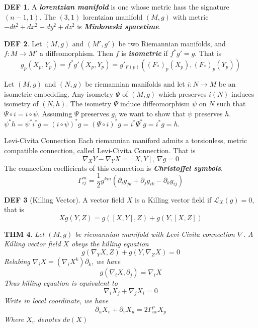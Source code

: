\documentclass[twocolumn]{article}
\renewcommand{\emph}[1]{\textbf{\textit{#1}}}
\newcommand{\n}{\nabla}
\newcommand{\p}{\partial}
\newcommand{\G}{\Gamma}
\newtheorem{thm}{THM}
\theoremstyle{definition}
\newtheorem{defi}[thm]{DEF}
\begin{document}
\begin{defi}
	A \emph{lorentzian manifold} is one whose metric hass the signature $(n-1,1)$.
	The $(3,1)$ lorentzian manifold $(M, g)$ with metric $-dt^2 + dx^2 + dy^2 + dz^2$ is \emph{Minkowski spacetime}.
\end{defi}

\begin{defi}
	Let $(M, g)$ and $(M', g')$ be two Riemannian manifolds, and $f: M \rightarrow M'$ a diffeomorphism. 
	Then $f$ is \emph{isometric} if $f^*g' = g$.
	That is 
	$$
	g_p(X_p, Y_p) = f^*g'(X_p, Y_p) = g'_{F(p)}((F_*)_p(X_p), (F_*)_p(Y_p))
	$$
\end{defi}

\begin{eg}{}{}
	Let $(M, g)$ and $(N, g)$ be riemannian manifolds and let $i: N \rightarrow M$ be an isometric embedding. Any isometry $\Psi$ of $(M, g)$ which preserves $i(N)$ induces isometry of $(N, h)$.
	\tcblower
	The isometry $\Psi$ induce diffeomorphism $\psi$ on $N$ such that $\Psi \circ i = i \circ \psi$. 
	Assuming $\Psi$ preserves $g$, we want to show that $\psi$ preserves $h$.
	$\psi^*h = \psi^*i^*g = (i \circ \psi)^* g = (\Psi \circ i)^*g = i^* \Psi^* g = i^* g = h$.
\end{eg}

\begin{fthm}{Levi-Civita Connection}{}
	Each riemannian maniford admits a torsionless, metric compatible connection, called Levi-Civita Connection.
	That is
	$$
		\n_X Y - \n_Y X = [X, Y], \ \n g = 0
	$$
	The connection coefficients of this connection is \emph{Christoffel symbols}.
	$$
		\G_{ij}^m = \frac{1}{2} g^{km}(\p_i g_{jk} + \p_j g_{ik} - \p_k g_{ij} )
	$$
\end{fthm}

\begin{defi}[Killing Vector]
	A vector field $X$ is a Killing vector field if $\mathcal{L}_X(g) = 0$, that is 
	$$
	Xg(Y, Z) = g([X, Y], Z) + g(Y, [X, Z])
	$$
\end{defi}

\begin{thm}
	Let $(M, g)$ be riemannian manifold with Levi-Civita connection $\n$. A Killing vector field $X$ obeys the killing equation 
	$$
		g(\n_Y X, Z) + g(Y, \n_Z X) = 0
	$$
	Relabing $\n_i X = (\n_i X^k) \p_k$, we have 
	$$
		g(\n_i X, \p_j) = \n_i X
	$$
	Thus killing equation is equivalent to 
	$$
		\n_i X_j + \n_j X_i = 0
	$$
	Write in local coordinate, we have 
	$$
		\p_u X_v + \p_v X_u = 2 \G_{uv}^p X_p
	$$
	Where $X_v$ denotes $dv(X)$
\end{thm}
\end{document}
